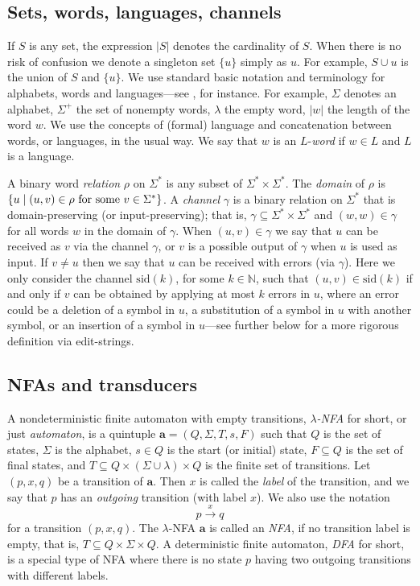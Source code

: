 \documentclass{article}
\theoremstyle{plain}
\theoremstyle{definition}
\theoremstyle{remark}
\newcommand{\N}{\mathbb{N}}
\newcommand{\xra}[1]{\xrightarrow{#1}}
\newcommand{\e}{\lambda}
\newcommand{\ew}{\e}
\newcommand\dsid{\ensuremath{\delta}\xspace}
\newcommand\al{\Sigma}        \newcommand\alG{\Gamma}        \newcommand\eew{(\e/\e)}        \newcommand\ealph{E_\al}   \newcommand\aut{\mathbf{a}}   \newcommand\autb{\mathbf{b}}   \newcommand\tr{\mathbf{t}}    \newcommand\sz[1]{|#1|}       \newcommand\weight[1]{\mathrm{weight}(#1)}       \newcommand\ch{\gamma}        \newcommand\chid{\mathrm{id}} \newcommand\chsid{\mathrm{sid}} \newcommand\dist{\dsid}               \newcommand\inp{\mathrm{inp}}
\begin{document}
\subsection{Sets, words, languages, channels}
If $S$ is any set, the expression $|S|$
denotes the cardinality
of $S$.
When there is no risk of confusion we denote a singleton set $\{u\}$ simply as $u$. For example, $S\cup u$ is the union of $S$ and $\{u\}$.
We use standard basic notation and terminology for alphabets, words and languages---see \cite{MaSa:handbook}, for instance. For example, $\al$ denotes an alphabet, $\al^+$ the set of nonempty words, $\ew$ the empty word, $|w|$ the length of the word $w$.
We use the concepts of (formal) language and concatenation between words, or languages, in the usual way. We say that $w$ is an $L$-\emph{word} if $w\in L$ and $L$ is a language.
\par
A binary word \emph{relation} $\rho$ on $\al^*$ is any subset of $\al^*\times\al^*$. The \emph{domain} of $\rho$ is $\{u\mid(u,v)\in\rho \hbox{ for some $v\in\al^*$}\}$.
A \emph{channel} $\ch$ is a binary relation on $\al^*$ that is domain-preserving (or input-preserving); that is, $\ch\subseteq\al^*\times\al^*$ and $(w,w)\in\ch$ for all words $w$
in the domain of $\ch$. When  $(u,v)\in\ch$ we say that $u$ can be received as $v$
via the channel $\ch$, or $v$ is a possible output of $\ch$
when $u$ is used as input. If $v\not=u$ then we say that
$u$ can be received with errors (via $\ch$). Here we only
consider the channel $\chsid(k)$, for some $k\in\N$, such that
$(u,v)\in\chsid(k)$ if and only if $v$ can be obtained by
applying at most $k$  errors in $u$, where an error
could be a deletion of a symbol in $u$, a substitution of a symbol in $u$ with
another symbol, or an insertion of a symbol in $u$---see further below
for a more rigorous definition via edit-strings.



\subsection{NFAs and transducers}
A  nondeterministic finite automaton
with empty transitions, \emph{$\ew$-NFA} for short, or
just \emph{automaton}, is a quintuple $\aut=(Q,\al, T,s, F)$ such that $Q$ is the set of states, $\al$ is the alphabet, $s\in Q$
is the start (or initial) state, $F\subseteq Q$ is the set of final states, and $T\subseteq Q\times(\al\cup\ew)\times Q$ is the finite set of transitions. Let $(p,x,q)$ be a transition of $\aut$. Then  $x$ is called the \emph{label} of the transition, and we say that $p$ has an \emph{outgoing} transition (with label $x$).
We also use the notation $$p\xra{x}q$$ for a transition
$(p,x,q)$.
The $\ew$-NFA $\aut$ is called an \emph{NFA}, if no transition label is empty, that is, $T\subseteq Q\times\al\times Q$. A deterministic finite automaton, \emph{DFA} for short, is a special type of NFA where there is no state $p$ having two outgoing transitions with different labels.
\end{document}
